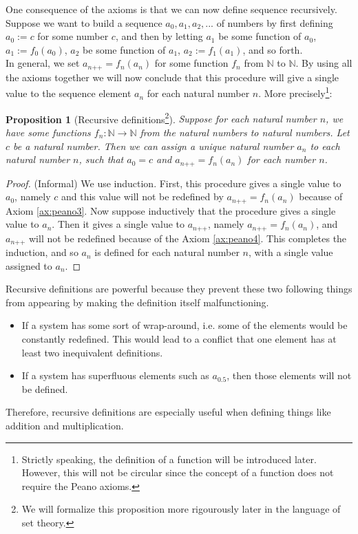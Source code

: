 \documentclass[a4paper,oneside]{book}
\newtheorem*{proof}{\textit{Proof.}}
\newtheorem{proposition}{Proposition}[section]
\begin{document}
			One consequence of the axioms is that we can now define sequence recursively. Suppose we want to build a sequence $a_0, a_1, a_2,...$ of numbers by first defining $a_0 := c$ for some number $c$, and then by letting $a_1$ be some function of $a_0$, $a_1 := f_{0}(a_0)$, $a_2$ be some function of $a_1$, $a_2 := f_{1}(a_1)$, and so forth.\\
			In general, we set $a_{n\texttt{++}}=f_{n}(a_n)$ for some function $f_n$ from $\mathbb{N}$ to $\mathbb{N}$. By using all the axioms together we will now conclude that this procedure will give a single value to the sequence element $a_n$ for each natural number $n$. More precisely\footnote{Strictly speaking, the definition of a function will be introduced later. However, this will not be circular since the concept of a function does not require the Peano axioms.}:
			\begin{proposition}[Recursive definitions\footnote{We will formalize this proposition more rigourously later in the language of set theory.}]
				Suppose for each natural number $n$, we have some functions $f_{n} : \mathbb{N} \rightarrow \mathbb{N}$ from the natural numbers to natural numbers. Let $c$ be a natural number. Then we can assign a unique natural number $a_{n}$ to each natural number $n$, such that $a_0 = c$ and $a_{n\texttt{++}}=f_{n}(a_n)$ for each number $n$. 
			\end{proposition}
			\begin{proof}
				(Informal) We use induction. First, this procedure gives a single value to $a_0$, namely $c$ and this value will not be redefined by $a_{n\texttt{++}}=f_{n}(a_n)$ because of Axiom \ref{ax:peano3}. Now suppose inductively that the procedure gives a single value to $a_n$. Then it gives a single value to $a_{n\texttt{++}}$, namely $a_{n\texttt{++}}=f_{n}(a_n)$, and $a_{n\texttt{++}}$ will not be redefined because of the Axiom \ref{ax:peano4}. This completes the induction, and so $a_n$ is defined for each natural number $n$, with a single value assigned to $a_n$.
			\end{proof}
			Recursive definitions are powerful because they prevent these two following things from appearing by making the definition itself malfunctioning.
			\begin{itemize}
				\item If a system has some sort of wrap-around, i.e. some of the elements would be constantly redefined. This would lead to a conflict that one element has at least two inequivalent definitions.
				\item If a system has superfluous elements such as $a_{0.5}$, then those elements will not be defined.
			\end{itemize}
			Therefore, recursive definitions are especially useful when defining things like addition and multiplication.
\end{document}
